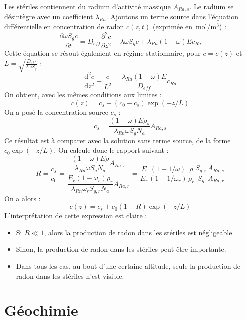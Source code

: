 \documentclass{article}
\begin{document}
Les stériles contiennent du radium d’activité massique $A_{Ra,s}$. Le radium se désintègre avec un coefficient $\lambda_{Ra}$. Ajoutons un terme source dans l’équation différentielle en concentration de radon $c(z,t)$ (exprimée en~mol/m$^3$) :
$$
\frac{\partial \omega S_g c}{\partial t} = D_{eff}  \frac{\partial^2 c}{\partial z^2}-\lambda \omega S_g c + \lambda_{Ra}(1-\omega)E c_{Ra}
$$
Cette équation se résout également en régime stationnaire, pour $c=c(z)$ et $L=\sqrt{\frac{D_{eff}}{\lambda \omega S_g }}$ :
$$
\frac{\text{d}^2 c}{\text{d}z^2} - \frac{c}{L^2}= \frac{\lambda_{Ra}(1-\omega)E}{D_{eff}} c_{Ra}
$$
On obtient, avec les mêmes conditions aux limites :
$$
c(z)= c_s + (c_0 - c_s) \exp(-z/L)
$$
On a posé la concentration source $c_s$ :
$$
c_s = \frac{(1-\omega)E\rho_s}{\lambda_{Rn}\omega S_g N_a} A_{Ra,s} 
$$
Ce résultat est à comparer avec la solution sans terme source, de la forme $c_0 \exp(-z/L)$. On calcule donc le rapport suivant :
$$
R=\dfrac{c_s}{c_0}= \dfrac{\dfrac{(1-\omega)E\rho}{\lambda_{Rn}\omega S_g N_a} A_{Ra,s}}{\dfrac{ E_r (1-\omega_r) \rho_r }{\lambda_{Rn} \omega_r S_{g,r} N_a} A_{Ra,r}} = \frac{E}{E_r} \frac{(1-1/\omega)}{(1-1/\omega_r)} \frac{\rho}{\rho_r} \frac{S_{g,r}}{S_g} \frac{A_{Ra,s}}{A_{Ra,r}}
$$
On a alors :
$$
c(z)=c_s + c_0(1-R) \exp(-z/L)
$$
L'interprétation de cette expression est claire :
\begin{itemize}
  \item Si $R\ll 1$, alors la production de radon dans les stériles est négligeable.
  \item Sinon, la production de radon dans les stériles peut être importante.
  \item Dans tous les cas, au bout d'une certaine altitude, seule la production de radon dans les stériles n'est visible.
\end{itemize}



\section{Géochimie}
\end{document}
